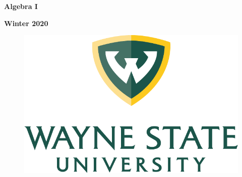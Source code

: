 \centerline{\bf Algebra I}
\vspace{-0.4cm}
\centerline{\bf Winter 2020}

\begin{figure}[!htbp]
    \centering
    \includegraphics[width=0.25\linewidth]{fig/wsu_primary_stacked_color.pdf}
\end{figure}

\thispagestyle{empty}